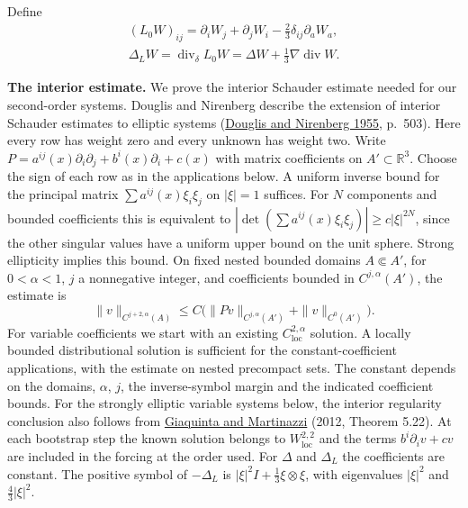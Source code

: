 \documentclass[
  english,
  11pt,
  reqno]{amsart}
\makeatletter
\newcommand{\paperleadspace}{%
  \par\if@nobreak\else
    \addpenalty{\@secpenalty}\addvspace{.5\baselineskip}%
  \fi}
\newcommand{\paperleadin}[1]{%
  \ifvmode\paperleadspace\fi
  \textbf{#1}}
\makeatother
\begin{document}
Define%
 \[
\begin{gathered}
(L_0W)_{ij}
=\partial_iW_j+\partial_jW_i
-\frac23\delta_{ij}\partial_aW_a, \\
\Delta_LW=\operatorname{div}_\delta L_0W
=\Delta W+\frac13\nabla\operatorname{div}W.
\end{gathered}
\]

\paperleadin{The interior estimate.} We prove the interior Schauder
estimate needed for our second-order systems. Douglis and Nirenberg
describe the extension of interior Schauder estimates to elliptic
systems (\hyperref[ref-DouglisNirenberg1955]{Douglis and Nirenberg
1955}, p.~503). Here every row has weight zero and every unknown has
weight two. Write
\(P=a^{ij}(x)\partial_i\partial_j+b^i(x)\partial_i+c(x)\) with matrix
coefficients on \(A'\subset\mathbb R^3\). Choose the sign of each row as
in the applications below. A uniform inverse bound for the principal
matrix \(\sum a^{ij}(x)\xi_i\xi_j\) on \(|\xi|=1\) suffices. For \(N\)
components and bounded coefficients this is equivalent to
\(|\det (\sum a^{ij}(x)\xi_i\xi_j)|\ge c|\xi|^{2N}\), since the other
singular values have a uniform upper bound on the unit sphere. Strong
ellipticity implies this bound. On fixed nested bounded domains
\(A\Subset A'\), for \(0<\alpha<1\), \(j\) a nonnegative integer, and
coefficients bounded in \(C^{j,\alpha}(A')\), the estimate is%
 \[
\|v\|_{C^{j+2,\alpha}(A)}
\le C\bigl(\|Pv\|_{C^{j,\alpha}(A')}
+\|v\|_{C^0(A')}\bigr).
\] For variable coefficients we start with an existing
\(C^{2,\alpha}_{\mathrm{loc}}\) solution. A locally bounded
distributional solution is sufficient for the constant-coefficient
applications, with the estimate on nested precompact sets. The constant
depends on the domains, \(\alpha\), \(j\), the inverse-symbol margin and
the indicated coefficient bounds. For the strongly elliptic variable
systems below, the interior regularity conclusion also follows from
\hyperref[ref-GiaquintaMartinazzi2012]{Giaquinta and Martinazzi} (2012,
Theorem 5.22). At each bootstrap step the known solution belongs to
\(W^{2,2}_{\mathrm{loc}}\) and the terms \(b^i\partial_i v+cv\) are
included in the forcing at the order used. For \(\Delta\) and
\(\Delta_L\) the coefficients are constant. The positive symbol of
\(-\Delta_L\) is \(|\xi|^2I+\frac13\xi\otimes\xi\), with eigenvalues
\(|\xi|^2\) and \(\frac43|\xi|^2\).
\end{document}
